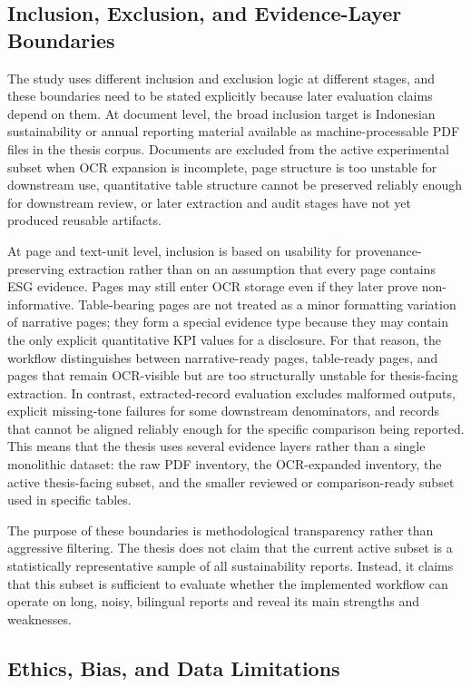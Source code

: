 \subsection{Inclusion, Exclusion, and Evidence-Layer Boundaries}

The study uses different inclusion and exclusion logic at different stages, and these boundaries need to be stated explicitly because later evaluation claims depend on them. At document level, the broad inclusion target is Indonesian sustainability or annual reporting material available as machine-processable PDF files in the thesis corpus. Documents are excluded from the active experimental subset when OCR expansion is incomplete, page structure is too unstable for downstream use, quantitative table structure cannot be preserved reliably enough for downstream review, or later extraction and audit stages have not yet produced reusable artifacts.

At page and text-unit level, inclusion is based on usability for provenance-preserving extraction rather than on an assumption that every page contains ESG evidence. Pages may still enter OCR storage even if they later prove non-informative. Table-bearing pages are not treated as a minor formatting variation of narrative pages; they form a special evidence type because they may contain the only explicit quantitative KPI values for a disclosure. For that reason, the workflow distinguishes between narrative-ready pages, table-ready pages, and pages that remain OCR-visible but are too structurally unstable for thesis-facing extraction. In contrast, extracted-record evaluation excludes malformed outputs, explicit missing-tone failures for some downstream denominators, and records that cannot be aligned reliably enough for the specific comparison being reported. This means that the thesis uses several evidence layers rather than a single monolithic dataset: the raw PDF inventory, the OCR-expanded inventory, the active thesis-facing subset, and the smaller reviewed or comparison-ready subset used in specific tables.

The purpose of these boundaries is methodological transparency rather than aggressive filtering. The thesis does not claim that the current active subset is a statistically representative sample of all sustainability reports. Instead, it claims that this subset is sufficient to evaluate whether the implemented workflow can operate on long, noisy, bilingual reports and reveal its main strengths and weaknesses.

\subsection{Ethics, Bias, and Data Limitations}

